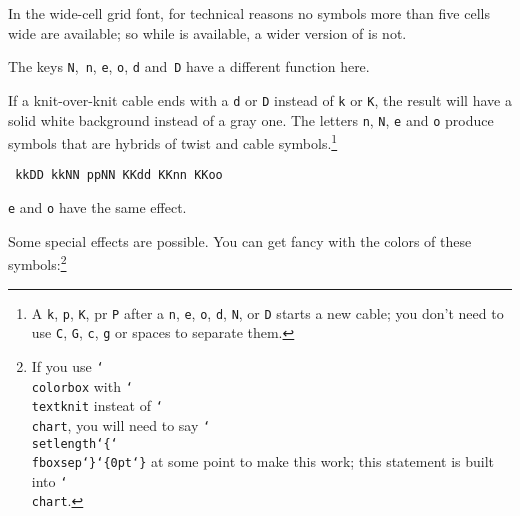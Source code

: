 \documentclass[draft]{amsart}
\begin{document}
In the wide-cell grid font, for technical reasons no symbols more than five cells wide are available; so while \knitwide{} is available, a wider version of \knitgrid{} is not.

The keys \texttt{N},~\texttt{n}, \texttt{e}, \texttt{o}, \texttt{d} and~\texttt{D} have a different function here. 

If a knit-over-knit cable ends with a \texttt{d} or \texttt{D} instead of \texttt{k} or \texttt{K}, the result will have a solid white background instead of a gray one. The letters \texttt{n}, \texttt{N}, \texttt{e} and \texttt{o} produce symbols that are hybrids of twist and cable symbols.\footnote{A \texttt{k}, \texttt{p}, \texttt{K}, pr \texttt{P} after a \texttt{n}, \texttt{e}, \texttt{o}, \texttt{d}, \texttt{N}, or \texttt{D} starts a new cable; you don't need to use \texttt{C}, \texttt{G}, \texttt{c}, \texttt{g} or spaces to separate them.}
\begin{center}
\begin{minipage}[b]{108pt}
\obeylines\parindent=0pt\tt 
kkDD~kkNN~ppNN
KKdd~KKnn~KKoo
\end{minipage}
\quad
\begin{minipage}[t]{224pt}
\end{minipage}
\end{center}
\texttt{e} and \texttt{o} have the same effect.

Some special effects are possible. You can get fancy with the colors of these symbols:\footnote{If you use \texttt{\char`\\colorbox} with \texttt{\char`\\textknit} insteat of \texttt{\char`\\chart}, you will need to say \texttt{\char`\\setlength\allowbreak\char`\{\char`\\fboxsep\char`\}\char`\{0pt\char`\}} at some point to make this work; this statement is built into \texttt{\char`\\chart}.}

\bigskip


\smallskip

\end{document}
